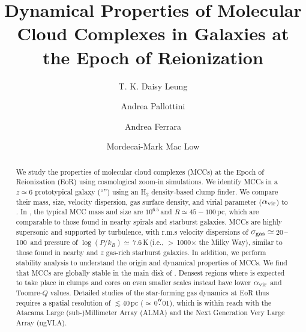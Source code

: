 \IfFileExists{emulateapjlegacy.cls}{\documentclass[iop]{emulateapjlegacy}}{\documentclass[iop]{emulateapj}}
\begin{document}
\title{Dynamical Properties of Molecular Cloud Complexes in Galaxies at the Epoch of Reionization}

\author{T. K. Daisy Leung}
\author{Andrea Pallottini}
\author{Andrea Ferrara}
\author{Mordecai-Mark Mac Low}


\begin{abstract}
We study the properties of molecular cloud complexes (MCCs) at the Epoch of Reionization (EoR) using cosmological zoom-in simulations.
We identify MCCs in a $z\simeq 6$ prototypical galaxy (``\flower'') 
using an H$_2$ density-based clump finder. 
We compare their mass, size, velocity dispersion, gas surface density, and virial parameter ($\alpha_{\rm vir}$) to \obs.
%
In \flower, the typical MCC mass and size are $10^{6.5}$\,\Msun and $R\simeq45-100$\,pc, 
which are comparable to those found in nearby spirals and starburst galaxies. 
MCCs are highly supersonic and supported by turbulence, with r.m.s velocity dispersions of $\sigma_{\rm gas}\simeq$\,20\,--\,100\,\kms
and pressure of $\log (P/k_B)\simeq$\,7.6\,K\,\cc (i.e., $>$\,1000$\times$ the Milky Way),
similar to those found in nearby and $z$ gas-rich starburst galaxies.
%
In addition, we perform stability analysis to understand the origin and dynamical properties of MCCs. We find that MCCs are globally stable in the main disk of \flower. Densest regions where \SF is expected to take place in 
clumps and cores on even smaller scales instead  have lower $\alpha_{\rm vir}$ and Toomre-$Q$ values.
Detailed studies of the star-forming gas dynamics at EoR thus requires a spatial resolution of $\lesssim$40\,pc 
($\simeq$\,0$\mbox{$.\!\!^{\prime\prime}$}$01), which is 
within reach with the Atacama Large (sub-)Millimeter Array (ALMA) and the Next Generation Very Large Array (ngVLA).
\end{abstract}
          
\end{document}
